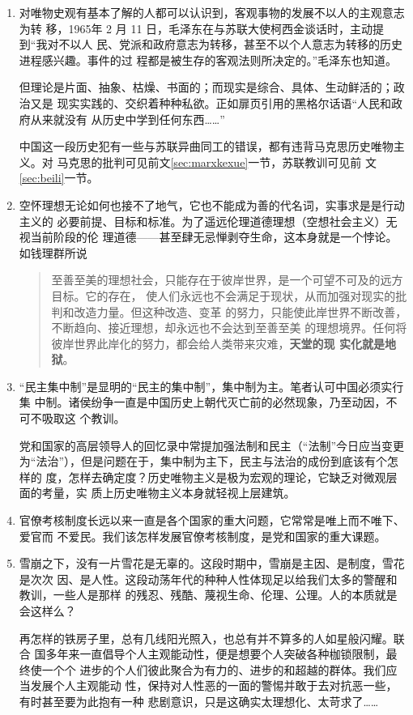 \begin{enumerate}
\item 对唯物史观有基本了解的人都可以认识到，客观事物的发展不以人的主观意志为转
  移，1965年 2 月 11 日，毛泽东在与苏联大使柯西金谈话时，主动提到“我对不以人
  民、党派和政府意志为转移，甚至不以个人意志为转移的历史进程感兴趣。事件的过
  程都是被生存的客观法则所决定的。”毛泽东也知道。

  但理论是片面、抽象、枯燥、书面的；而现实是综合、具体、生动鲜活的；政治又是
  现实实践的、交织着种种私欲。正如扉页引用的黑格尔话语“人民和政府从来就没有
  从历史中学到任何东西……”

  中国这一段历史犯有一些与苏联异曲同工的错误，都有违背马克思历史唯物主义。对
  马克思的批判可见前文\cref{sec:marxkexue}一节，苏联教训可见前
  文\cref{sec:beili}一节。

\item 空怀理想无论如何也接不了地气，它也不能成为善的代名词，实事求是是行动主义的
  必要前提、目标和标准。为了遥远伦理道德理想（空想社会主义）无视当前阶段的伦
  理道德——甚至肆无忌惮剥夺生命，这本身就是一个悖论。如钱理群所说
  \begin{quotation}
    至善至美的理想社会，只能存在于彼岸世界，是一个可望不可及的远方目标。它的存在，
    使人们永远也不会满足于现状，从而加强对现实的批判和改造力量。但这种改造、变革
    的努力，只能使此岸世界不断改善，不断趋向、接近理想，却永远也不会达到至善至美
    的理想境界。任何将彼岸世界此岸化的努力，都会给人类带来灾难，\textbf{天堂的现
      实化就是地狱}。
  \end{quotation}

\item “民主集中制”是显明的“民主的集中制”，集中制为主。笔者认可中国必须实行集
  中制。诸侯纷争一直是中国历史上朝代灭亡前的必然现象，乃至动因，不可不吸取这
  个教训。

  党和国家的高层领导人的回忆录中常提加强法制和民主（“法制”今日应当变更
  为“法治”），但是问题在于，集中制为主下，民主与法治的成份到底该有个怎样的
  度，怎样去确定度？历史唯物主义是极为宏观的理论，它缺乏对微观层面的考量，实
  质上历史唯物主义本身就轻视上层建筑。

\item 官僚考核制度长远以来一直是各个国家的重大问题，它常常是唯上而不唯下、爱官而
  不爱民。我们该怎样发展官僚考核制度，是党和国家的重大课题。

\item 雪崩之下，没有一片雪花是无辜的。这段时期中，雪崩是主因、是制度，雪花是次次
  因、是人性。这段动荡年代的种种人性体现足以给我们太多的警醒和教训，一些人是那样
  的残忍、残酷、蔑视生命、伦理、公理。人的本质就是会这样么？

  再怎样的铁房子里，总有几线阳光照入，也总有并不算多的人如星般闪耀。联合
  国多年来一直倡导个人主观能动性，便是想要个人突破各种枷锁限制，最终使一个个
  进步的个人们彼此聚合为有力的、进步的和超越的群体。我们应当发展个人主观能动
  性，保持对人性恶的一面的警惕并敢于去对抗恶一些，有时甚至要为此抱有一种
  悲剧意识，只是这确实太理想化、太苛求了……
\end{enumerate}

